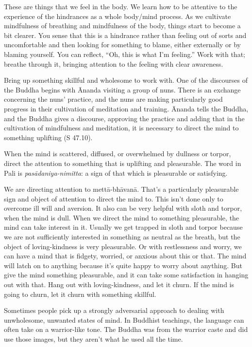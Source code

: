 These are things that we feel in the body. We learn how to be attentive
to the experience of the hindrances as a whole body/mind process. As we
cultivate mindfulness of breathing and mindfulness of the body, things
start to become a bit clearer. You sense that this is a hindrance rather
than feeling out of sorts and uncomfortable and then looking for
something to blame, either externally or by blaming yourself. You can
reflect, “Oh, this is what I’m feeling.” Work with that; breathe through
it, bringing attention to the feeling with clear awareness.

Bring up something skillful and wholesome to work with. One of the
discourses of the Buddha begins with Ānanda visiting a group of nuns.
There is an exchange concerning the nuns’ practice, and the nuns are
making particularly good progress in their cultivation of meditation and
training. Ānanda tells the Buddha, and the Buddha gives a discourse,
approving the practice and adding that in the cultivation of mindfulness
and meditation, it is necessary to direct the mind to something
uplifting (S 47.10).

When the mind is scattered, diffused, or overwhelmed by dullness or
torpor, direct the attention to something that is uplifting and
pleasurable. The word in Pali is \emph{pasādaniya-nimitta}: a sign of
that which is pleasurable or satisfying.

We are directing attention to mettā-bhāvanā. That’s a particularly
pleasurable sign and object of attention to direct the mind to. This
isn’t done only to overcome ill will and aversion. It also can be very
helpful with sloth and torpor, when the mind is dull. When we direct the
mind to something pleasurable, the mind can take interest in it. Usually
we get trapped in sloth and torpor because we are not sufficiently
interested in something as neutral as the breath, but the object of
loving-kindness is very pleasurable. Or with restlessness and worry, we
can have a mind that is fidgety, worried, or anxious about this or that.
The mind will latch on to anything because it’s quite happy to worry
about anything. But give the mind something pleasurable, and it can take
some satisfaction in hanging out with that. Hang out with
loving-kindness, and let it churn. If the mind is going to churn, let it
churn with something skillful.

Sometimes people pick up a strongly adversarial approach to dealing with
unwholesome, unwanted states of mind. In Buddhist teachings, the
language can often take on a warrior-like tone. The Buddha was from the
warrior caste and did use those images, but they aren’t what he used all
the time.

